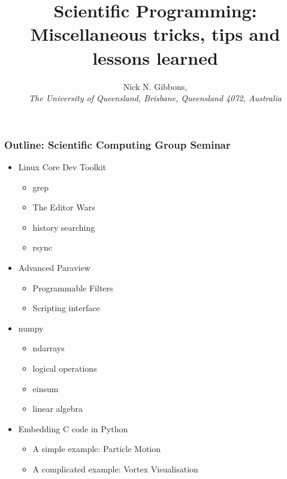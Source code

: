 \documentclass[landscape,10pt]{beamer}
\title{\textbf{Scientific Programming: Miscellaneous tricks, tips and lessons learned}}
\author{
  Nick N. Gibbons,\\
  {\itshape
   The University of Queensland, Brisbane, Queensland 4072, Australia}\\
 }
\begin{document}
\frame{\titlepage}

\begin{frame}
\frametitle{Outline: Scientific Computing Group Seminar}
\vspace{5mm}
\begin{itemize}
\item Linux Core Dev Toolkit
\begin{itemize}
\item grep
\item The Editor Wars
\item history searching
\item rsync
\end{itemize}
\item Advanced Paraview
\begin{itemize}
\item Programmable Filters
\item Scripting interface
\end{itemize}
\item numpy
\begin{itemize}
\item ndarrays
\item logical operations
\item einsum
\item linear algebra
\end{itemize}
\item Embedding C code in Python
\begin{itemize}
\item A simple example: Particle Motion
\item A complicated example: Vortex Visualisation
\end{itemize}
\end{itemize}
\end{frame}
\end{document}
